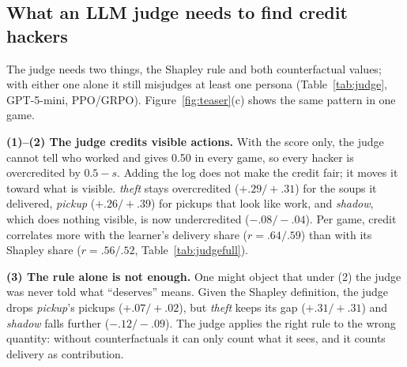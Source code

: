 \documentclass[letterpaper]{article} %
\begin{document}
\subsection{What an LLM judge needs to find credit hackers}
\begin{table}[!ht]
\centering
\footnotesize
\setlength{\tabcolsep}{2.6pt}

\caption{Credit gap $o-s$ of each hacker persona and the fair reference \emph{greedy} ($s=0.50$) under each judge
input: the credit $o$ GPT-5-mini gives the learner minus its true Shapley share $s$, mean over games (PPO/GRPO; $N=60$
per cell). Positive: overcredited. \colorbox{green!25}{Green}: $|o-s|<0.10$; \colorbox{red!30}{red}: larger, darker for larger gaps.
Credit $o$, $s$ and error rates: Table~\ref{tab:judgefull} (Appendix~\ref{app:gpt}).}
\label{tab:judge}
\end{table}

The judge needs two things, the Shapley rule and both counterfactual values; with either one alone it
still misjudges at least one persona (Table~\ref{tab:judge}, GPT-5-mini, PPO/GRPO). Figure~\ref{fig:teaser}(c) shows
the same pattern in one game.

\textbf{(1)--(2) The judge credits visible actions.} With the score only, the judge cannot tell who worked and gives
0.50 in every game, so every hacker is overcredited by $0.5-s$. Adding the log does not make the credit fair; it moves
it toward what is visible. \emph{theft} stays overcredited ($+.29/+.31$) for the soups it delivered, \emph{pickup}
($+.26/+.39$) for pickups that look like work, and \emph{shadow}, which does nothing visible, is now undercredited
($-.08/-.04$). Per game, credit correlates more with the learner's delivery share ($r=.64/.59$) than with its
Shapley share ($r=.56/.52$, Table~\ref{tab:judgefull}).

\textbf{(3) The rule alone is not enough.} One might object that under (2) the judge was never told what ``deserves''
means. Given the Shapley definition, the judge drops \emph{pickup}'s pickups ($+.07/+.02$), but \emph{theft} keeps its
gap ($+.31/+.31$) and \emph{shadow} falls further ($-.12/-.09$). The judge applies the right rule to the wrong quantity:
without counterfactuals it can only count what it sees, and it counts delivery as contribution.
\end{document}
